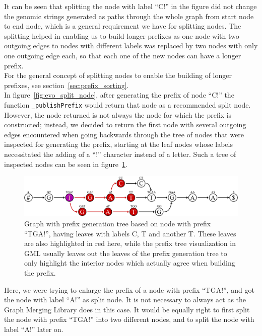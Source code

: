 \documentclass[a4paper,12pt,twoside,BCOR=10mm]{scrbook}
\begin{document}
It can be seen that splitting the node with label “C!” in the figure did not change the 
genomic strings generated as paths through the whole graph from start node to end node, 
which is a general requirement we have for splitting nodes. 
The splitting helped in enabling us to build longer prefixes as one node with 
two outgoing edges to nodes with different labels was replaced by two nodes 
with only one outgoing edge each, so that each one of the new nodes can 
have a longer prefix. \\
For the general concept of splitting nodes to 
enable the building of longer prefixes, see section~\ref{sec:prefix_sorting}. \\
In figure~\ref{fig:evo_split_node}, 
after generating the prefix of node “C!” the function \texttt{\_publishPrefix} would 
return that node as a recommended split node. However, the node returned is 
not always the node for which the prefix is constructed; instead, we decided to return the first node 
with several outgoing edges encountered when going backwards through the tree of nodes 
that were inspected for generating the prefix, starting at the leaf nodes whose labels 
necessitated the adding of a “!” character instead of a letter. 
Such a tree of inspected nodes can be seen in figure~\ref{fig:evo_node_splitting_tree}. 
\begin{figure}[!htb]
\centering
\includegraphics[width=\textwidth]{evo_node_splitting_tree.pdf}
\caption[Graph with prefix generation tree]{Graph with prefix generation tree based on node with prefix \textup{“TGA!”}, having leaves with labels \textup{C, T} and another \textup{T}. These leaves are also highlighted in red here, while the prefix tree visualization in GML usually leaves out the leaves of the prefix generation tree to only highlight the interior nodes which actually agree when building the prefix.} \label{fig:evo_node_splitting_tree}
\end{figure}
Here, we were trying to enlarge the prefix of a node with prefix “TGA!”, 
and got the node with label “A!” as split node. 
It is not necessary to always act as the Graph Merging Library does in this case. 
It would be equally right to first split the node with prefix “TGA!” into two different nodes, 
and to split the node with label “A!” later on.
\end{document}
